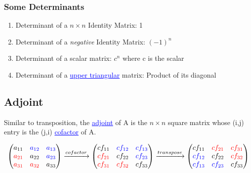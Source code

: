 \documentclass{article}
\newcommand{\bul}[1]{\textcolor{blue}{\underline{#1}}}
\newcommand{\sbreak}{\vspace{10pt}}
\begin{document}
\subsubsection{Some Determinants}
\begin{enumerate}
    \item Determinant of a $n\times n$ Identity Matrix: 1
    \item Determinant of a \textit{negative} Identity Matrix: $(-1)^{n}$
    \item Determinant of a scalar matrix: $c^n$ where c is the scalar
    \item Determinant of a \bul{upper triangular} matrix: Product of its diagonal
\end{enumerate}

\subsection{Adjoint}
Similar to transposition, the \bul{adjoint} of A is the $n\times n$ square matrix whose (i,j) entry is the (j,i) \bul{cofactor} of A.

\[
\begin{pmatrix}
a_{11} & \textcolor{blue}{a_{12}} & \textcolor{blue}{a_{13}} \\
\textcolor{red}{a_{21}} & a_{22} & \textcolor{blue}{a_{23}} \\
\textcolor{red}{a_{31}} & \textcolor{red}{a_{32}} & a_{33} 
\end{pmatrix}
\xrightarrow{cofactor}
\begin{pmatrix}
cf_{11} & \textcolor{blue}{cf_{12}} & \textcolor{blue}{cf_{13}} \\
\textcolor{red}{cf_{21}} & cf_{22} & \textcolor{blue}{cf_{23}} \\
\textcolor{red}{cf_{31}} & \textcolor{red}{cf_{32}} & cf_{33} 
\end{pmatrix}
\xrightarrow{transpose}
\begin{pmatrix}
    cf_{11} & \textcolor{red}{cf_{21}} & \textcolor{red}{cf_{31}} \\
    \textcolor{blue}{cf_{12}} & cf_{22} & \textcolor{red}{cf_{32}} \\
    \textcolor{blue}{cf_{13}} & \textcolor{blue}{cf_{23}} & cf_{33}
\end{pmatrix}
\]

\sbreak
\end{document}
